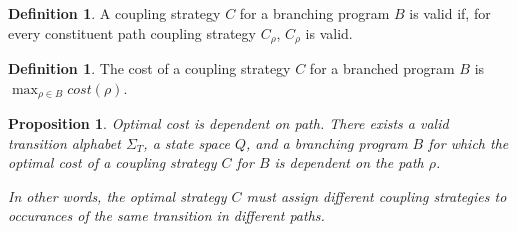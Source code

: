 \documentclass[12pt]{article}
\newtheorem{prop}[thm]{Proposition}
\theoremstyle{definition}
\newtheorem{defn}[thm]{Definition}
\begin{document}
\begin{defn}
    A coupling strategy $C$ for a branching program $B$ is valid if, for every constituent path coupling strategy $C_\rho$, $C_\rho$ is valid. 
\end{defn}

\begin{defn}
    The cost of a coupling strategy $C$ for a branched program $B$ is $\max_{\rho\in B}cost(\rho)$.
\end{defn}

\begin{prop}\label{costDependspathProp}
    Optimal cost is dependent on path. There exists a valid transition alphabet $\Sigma_T$, a state space $Q$, and a branching program $B$ for which the optimal cost of a coupling strategy $C$ for $B$ is dependent on the path $\rho$. 
    
    In other words, the optimal strategy $C$ must assign different coupling strategies to occurances of the same transition in different paths. 
\end{prop}
\end{document}
